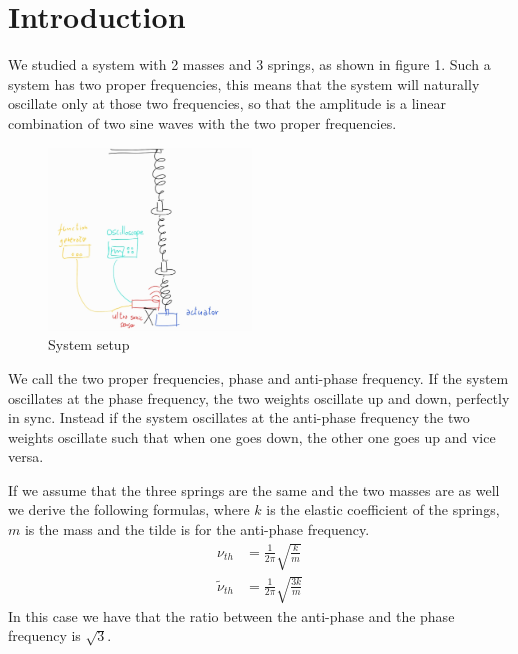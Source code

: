 \documentclass{article}
\begin{document}
\section{Introduction} \label{sec:intro}
We studied a system with 2 masses and 3 springs, as shown in figure 1. %
Such a system has two proper frequencies, this means that the system will naturally oscillate only at those two frequencies, so that the amplitude is a linear combination of two sine waves with the two proper frequencies. 
\begin{figure}
  \begin{center}
    \includegraphics[width=0.48\textwidth]{Setup}
  \end{center}
  \label{img:setup}
  \caption{System setup}
\end{figure}
We call the two proper frequencies, phase and anti-phase frequency. If the system oscillates at the phase frequency, the two weights oscillate up and down, perfectly in sync. Instead if the system oscillates at the anti-phase frequency the two weights oscillate such that when one goes down, the other one goes up and vice versa. 

If we assume that the three springs are the same and the two masses are as well 
we derive the following formulas, where $k$ is the elastic coefficient of the springs, $m$ is the mass and the tilde is for the anti-phase frequency.
\begin{align}
    \nu_{th} &= \frac{1}{2\pi}   \sqrt{\frac{ k}{m}}
        \label{eq:nuth} \\
    \tilde \nu_{th} &= \frac{1}{2\pi}   \sqrt{\frac{3k}{m}}
        \label{eq:antinuth}
\end{align}
In this case we have that the ratio between the anti-phase and the phase frequency is $\sqrt 3$.
\end{document}
